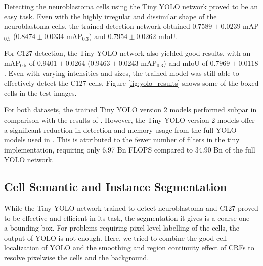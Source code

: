 \documentclass[10pt, journal, compsoc]{IEEEtran}
\begin{document}
Detecting the neuroblastoma cells using the Tiny YOLO network proved to be an easy task. Even with the highly irregular and dissimilar shape of the neuroblastoma cells, the trained detection network obtained $0.7589\pm0.0239$ mAP$_{0.5}$ ($0.8474\pm0.0334$ mAP$_{0.3}$) and $0.7954\pm0.0262$ mIoU.

For C127 detection, the Tiny YOLO network also yielded good results, with an mAP$_{0.5}$ of $0.9401\pm0.0264$ ($0.9463\pm0.0243$ mAP$_{0.3}$) and mIoU of $0.7969\pm0.0118$. Even with varying intensities and sizes, the trained model was still able to effectively detect the C127 cells. Figure \ref{fig:yolo_results} shows some of the boxed  cells in the test images.

For both datasets, the trained Tiny YOLO version 2 models performed subpar in comparison with the results of \cite{Waithe544833}. However, the Tiny YOLO version 2 models offer a significant reduction in detection and memory usage from the full YOLO models used in \cite{Waithe544833}. This is attributed to the fewer number of filters in the tiny implementation, requiring only 6.97 Bn FLOPS compared to 34.90 Bn of the full YOLO network\cite{redmon2016yolo9000}.
\subsection{Cell Semantic and Instance Segmentation}
While the Tiny YOLO network trained to detect neuroblastoma and C127 proved to be effective and efficient in its task, the segmentation it gives is a coarse one - a bounding box. For problems requiring pixel-level labelling of the cells, the output of YOLO is not enough. Here, we tried to combine the good cell localization of YOLO and the smoothing  and region continuity effect of CRFs to resolve pixelwise the cells and the background.
\end{document}
